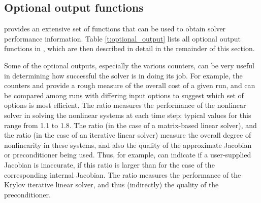 \subsection{Optional output functions}\label{ss:optional_output}

{\cvode} provides an extensive set of functions that can be used to obtain
solver performance information.
Table \ref{t:optional_output} lists all optional output functions in {\cvode},
which are then described in detail in the remainder of this section.

Some of the optional outputs, especially the various counters, can be
very useful in determining how successful the {\cvode} solver is in
doing its job.  For example, the counters  and 
provide a rough measure of the overall cost of a given run, and can be
compared among runs with differing input options to suggest which set
of options is most efficient.  The ratio  measures
the performance of the nonlinear solver in solving the nonlinear
systems at each time step; typical values for this range from 1.1 to
1.8.  The ratio  (in the case of a matrix-based linear
solver), and the ratio  (in the case of an
iterative linear solver) measure the overall degree of nonlinearity
in these systems, and also the quality of the approximate Jacobian or
preconditioner being used.  Thus, for example, 
can indicate if a user-supplied Jacobian is inaccurate, if this ratio
is larger than for the case of the corresponding internal Jacobian.
The ratio  measures the performance of the Krylov
iterative linear solver, and thus (indirectly) the quality of the
preconditioner.

\vspace*{.2in}

\newlength{\colAA}
\settowidth{\colAA}{No. of r.h.s. calls for finite diff. Jacobian[-vector] evals.}
\newlength{\colBB}



